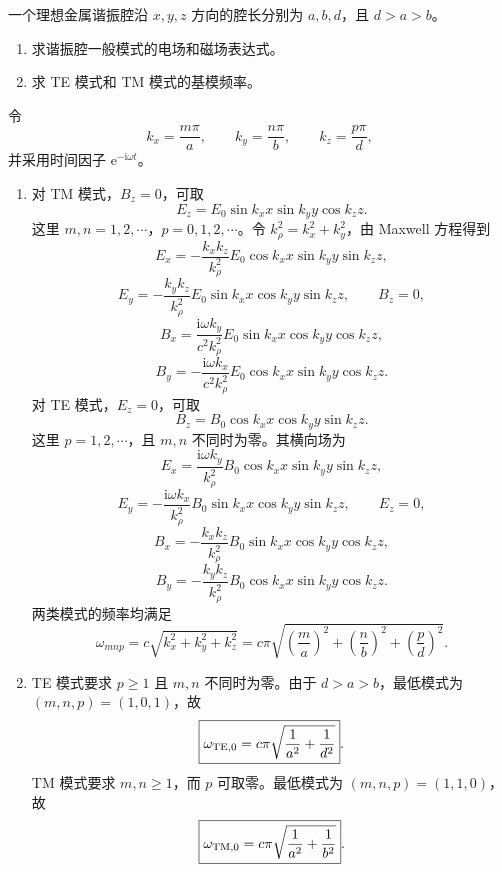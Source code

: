 \begin{question}[理想金属矩形谐振腔]
一个理想金属谐振腔沿 $x,y,z$ 方向的腔长分别为 $a,b,d$，且 $d>a>b$。
\begin{enumerate}
  \item 求谐振腔一般模式的电场和磁场表达式。
  \item 求 TE 模式和 TM 模式的基模频率。
\end{enumerate}
\begin{solution}
令
\[
  k_x=\frac{m\pi}{a},\qquad
  k_y=\frac{n\pi}{b},\qquad
  k_z=\frac{p\pi}{d},
\]
并采用时间因子 $\mathrm e^{-\mathrm i\omega t}$。
\begin{enumerate}
  \item 对 TM 模式，$B_z=0$，可取
  \[
    E_z=E_0\sin k_xx\sin k_yy\cos k_zz .
  \]
  这里 $m,n=1,2,\cdots$，$p=0,1,2,\cdots$。令 $k_\rho^2=k_x^2+k_y^2$，由 Maxwell 方程得到
  \[
    E_x=-\frac{k_xk_z}{k_\rho^2}E_0\cos k_xx\sin k_yy\sin k_zz,
  \]
  \[
    E_y=-\frac{k_yk_z}{k_\rho^2}E_0\sin k_xx\cos k_yy\sin k_zz,
    \qquad B_z=0,
  \]
  \[
    B_x=\frac{\mathrm i\omega k_y}{c^2k_\rho^2}E_0\sin k_xx\cos k_yy\cos k_zz,
  \]
  \[
    B_y=-\frac{\mathrm i\omega k_x}{c^2k_\rho^2}E_0\cos k_xx\sin k_yy\cos k_zz .
  \]
  对 TE 模式，$E_z=0$，可取
  \[
    B_z=B_0\cos k_xx\cos k_yy\sin k_zz .
  \]
  这里 $p=1,2,\cdots$，且 $m,n$ 不同时为零。其横向场为
  \[
    E_x=\frac{\mathrm i\omega k_y}{k_\rho^2}B_0\cos k_xx\sin k_yy\sin k_zz,
  \]
  \[
    E_y=-\frac{\mathrm i\omega k_x}{k_\rho^2}B_0\sin k_xx\cos k_yy\sin k_zz,
    \qquad E_z=0,
  \]
  \[
    B_x=-\frac{k_xk_z}{k_\rho^2}B_0\sin k_xx\cos k_yy\cos k_zz,
  \]
  \[
    B_y=-\frac{k_yk_z}{k_\rho^2}B_0\cos k_xx\sin k_yy\cos k_zz .
  \]
  两类模式的频率均满足
  \[
    \boxed{\omega_{mnp}=c\sqrt{k_x^2+k_y^2+k_z^2}}
    =c\pi\sqrt{\left(\frac{m}{a}\right)^2+
    \left(\frac{n}{b}\right)^2+\left(\frac{p}{d}\right)^2} .
  \]

  \item TE 模式要求 $p\geq1$ 且 $m,n$ 不同时为零。由于 $d>a>b$，最低模式为 $(m,n,p)=(1,0,1)$，故
  \[
    \boxed{\omega_{\rm TE,0}=c\pi\sqrt{\frac1{a^2}+\frac1{d^2}}} .
  \]
  TM 模式要求 $m,n\geq1$，而 $p$ 可取零。最低模式为 $(m,n,p)=(1,1,0)$，故
  \[
    \boxed{\omega_{\rm TM,0}=c\pi\sqrt{\frac1{a^2}+\frac1{b^2}}} .
  \]
\end{enumerate}
\end{solution}
\end{question}

